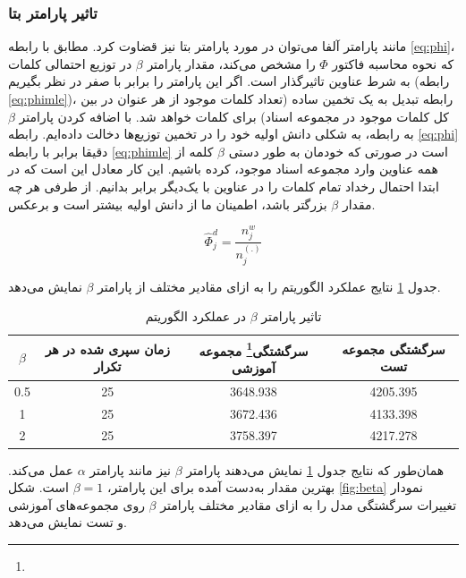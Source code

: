 \documentclass[11.5pt,a4paper]{article}
\newcommand{\enfootnote}[1]{\footnote{\lr{#1}}}
\begin{document}
\subsubsection{تاثیر پارامتر بتا}
مانند پارامتر آلفا می‌توان در مورد پارامتر بتا نیز قضاوت کرد. مطابق با رابطه \ref{eq:phi}، که نحوه محاسبه فاکتور $\Phi$ را مشخص می‌کند، مقدار پارامتر $\beta$ در توزیع احتمالی کلمات به شرط عناوین تاثیرگذار است. اگر این پارامتر را برابر با صفر در نظر بگیریم (رابطه \ref{eq:phimle})، رابطه تبدیل به یک تخمین  ساده (تعداد کلمات موجود از هر عنوان در بین کل کلمات موجود در مجموعه اسناد) برای کلمات خواهد شد. با اضافه کردن پارامتر $\beta$ به رابطه، به شکلی دانش اولیه خود را در تخمین توزیع‌ها دخالت داده‌ایم. رابطه \ref{eq:phi} دقیقا برابر با رابطه \ref{eq:phimle} است در صورتی که خودمان به طور دستی  $\beta$ کلمه از همه عناوین وارد مجموعه اسناد موجود، کرده باشیم. این کار معادل این است که در ابتدا احتمال رخداد تمام کلمات را در عناوین با یک‌دیگر برابر بدانیم. از طرفی هر چه مقدار $\beta$ بزرگتر باشد، اطمینان ما از دانش اولیه بیشتر است و برعکس.

\begin{equation}
\hat{\Phi}_{j}^{d} = \frac{n_j^w }{n_{j}^{(.)}}
\label{eq:phimle}
\end{equation}

جدول \ref{tbl:beta}
نتایج عملکرد الگوریتم را به ازای مقادیر مختلف از پارامتر $\beta$ نمایش می‌دهد. 
\begin{table}[h]
\center
\caption{تاثیر پارامتر $\beta$ در عملکرد الگوریتم}
\label{tbl:beta}
\begin{tabular}{c | c | c | c}
$\beta$ & زمان سپری شده در هر تکرار & سرگشتگی\enfootnote{Perplexity} مجموعه آموزشی & سرگشتگی مجموعه تست\\
\hline
\hline
0.5 & 25 & 3648.938 & 4205.395 \\
1 & 25 & 3672.436 & 4133.398 \\
2 & 25 & 3758.397 & 4217.278 \\
\end{tabular}
\end{table}

همان‌طور که نتایج جدول \ref{tbl:beta} نمایش می‌دهند پارامتر $\beta$ نیز مانند پارامتر $\alpha$ عمل می‌کند. بهترین مقدار به‌دست آمده برای این پارامتر، $\beta = 1$ است.
شکل 
\ref{fig:beta}
نمودار تغییرات سرگشتگی مدل را به ازای مقادیر مختلف پارامتر $\beta$ روی مجموعه‌های آموزشی و تست نمایش می‌دهد.
\end{document}
